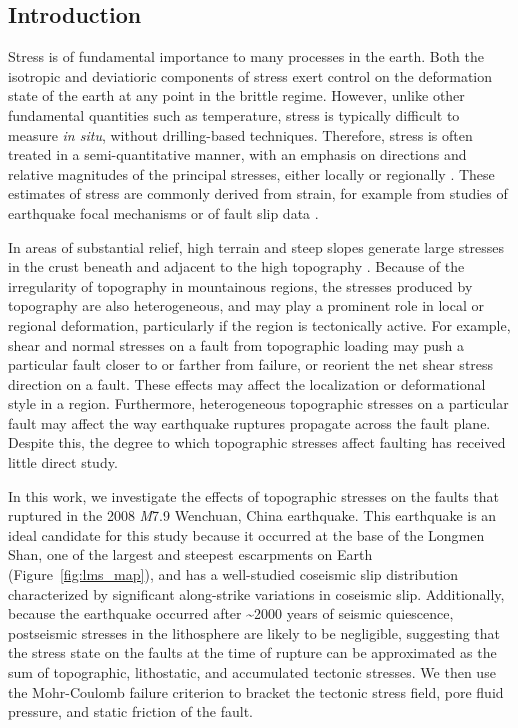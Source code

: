 \documentclass[twocolumn,jgrga]{AGUTeX}
\begin{document}
\begin{article} \section{Introduction}\label{introduction}
Stress is of fundamental importance to many processes in the earth. Both the
isotropic and deviatioric components of stress exert control on the deformation
state of the earth at any point in the brittle regime. However, unlike other
fundamental quantities such as temperature, stress is typically difficult to
measure \emph{in situ}, without drilling-based techniques. Therefore, stress is
often treated in a semi-quantitative manner, with an emphasis on directions and
relative magnitudes of the principal stresses, either locally or regionally
\citep[e.g.,][]{angelier1994}. These estimates of stress are commonly derived
from strain, for example from studies of earthquake focal mechanisms
\citep[e.g.,][]{michael1987} or of fault slip data \citep[e.g.,][]{reches1987,
medinaluna2013}.

In areas of substantial relief, high terrain and steep slopes generate large
stresses in the crust beneath and adjacent to the high topography
\citep{jeffreys1924, coblentz1996}. Because of the irregularity of topography
in mountainous regions, the stresses produced by topography are also
heterogeneous, and may play a prominent role in local or regional deformation,
particularly if the region is tectonically active.  For example, shear and
normal stresses on a fault from topographic loading may push a particular fault
closer to or farther from failure, or reorient the
net shear stress direction on a fault. These effects may affect the
localization or deformational style in a region. Furthermore, heterogeneous
topographic stresses on a particular fault may affect the way earthquake
ruptures propagate across the fault plane. Despite this, the degree to which
topographic stresses affect faulting has received little direct study.

In this work, we investigate the effects of topographic stresses on the faults
that ruptured in the 2008 \emph{M}7.9 Wenchuan, China earthquake.  This
earthquake is an ideal candidate for this study because it occurred at the base
of the Longmen Shan, one of the largest and steepest escarpments on Earth
(Figure~\ref{fig:lms_map}), and has a well-studied coseismic slip distribution
characterized by significant along-strike variations in coseismic slip.
Additionally, because the earthquake occurred after \textasciitilde{}2000 years
of seismic quiescence, postseismic stresses in the lithosphere are likely to be
negligible, suggesting that the stress state on the faults at the time of
rupture can be approximated as the sum of topographic, lithostatic, and
accumulated tectonic stresses. We then use the Mohr-Coulomb failure criterion
to bracket the tectonic stress field, pore fluid pressure, and static friction
of the fault.


\end{article}
\end{document}
